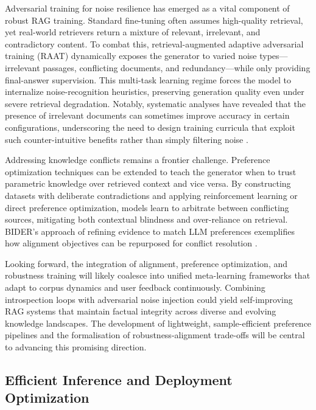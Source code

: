 \documentclass[11pt,a4paper]{article}
\begin{document}
Adversarial training for noise resilience has emerged as a vital component of robust RAG training. Standard fine-tuning often assumes high-quality retrieval, yet real-world retrievers return a mixture of relevant, irrelevant, and contradictory content. To combat this, retrieval-augmented adaptive adversarial training (RAAT) dynamically exposes the generator to varied noise types---irrelevant passages, conflicting documents, and redundancy---while only providing final-answer supervision. This multi-task learning regime forces the model to internalize noise-recognition heuristics, preserving generation quality even under severe retrieval degradation. Notably, systematic analyses have revealed that the presence of irrelevant documents can sometimes improve accuracy in certain configurations, underscoring the need to design training curricula that exploit such counter-intuitive benefits rather than simply filtering noise \cite{arxiv:2401.14887v3}.

Addressing knowledge conflicts remains a frontier challenge. Preference optimization techniques can be extended to teach the generator when to trust parametric knowledge over retrieved context and vice versa. By constructing datasets with deliberate contradictions and applying reinforcement learning or direct preference optimization, models learn to arbitrate between conflicting sources, mitigating both contextual blindness and over-reliance on retrieval. BIDER's approach of refining evidence to match LLM preferences exemplifies how alignment objectives can be repurposed for conflict resolution \cite{arxiv:2402.12174v1}.

Looking forward, the integration of alignment, preference optimization, and robustness training will likely coalesce into unified meta-learning frameworks that adapt to corpus dynamics and user feedback continuously. Combining introspection loops with adversarial noise injection could yield self-improving RAG systems that maintain factual integrity across diverse and evolving knowledge landscapes. The development of lightweight, sample-efficient preference pipelines and the formalisation of robustness-alignment trade-offs will be central to advancing this promising direction.


\subsection{Efficient Inference and Deployment Optimization}
\end{document}
